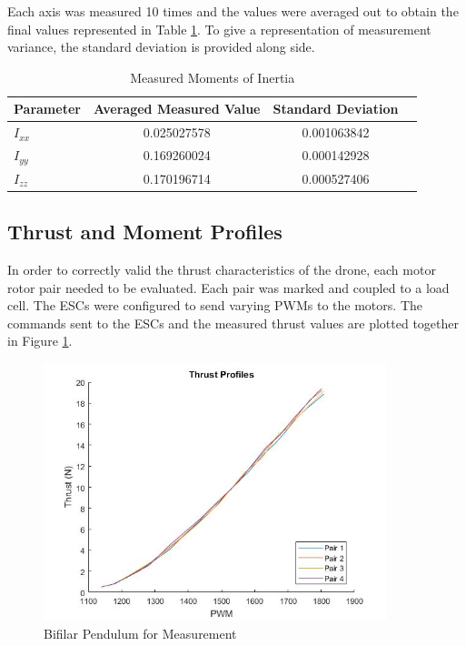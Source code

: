 	Each axis was measured 10 times and the values were averaged out to obtain the final values represented in Table \ref{tab:MomentOfInertia}. To give a representation of measurement variance, the standard deviation is provided along side.
	
	\begin{table}[!]
		\centering
		\begin{tabular}{l | c | c | c |}
			Parameter & Averaged Measured Value & Standard Deviation\\
			\hline\hline
			$I_{xx}$ & 0.025027578 & 0.001063842\\
			$I_{yy}$ & 0.169260024 & 0.000142928\\
			$I_{zz}$ & 0.170196714 & 0.000527406\\
		\end{tabular}
		\label{tab:MomentOfInertia}
		\caption{Measured Moments of Inertia}
	\end{table}
	
	\subsection{Thrust and Moment Profiles}
	In order to correctly valid the thrust characteristics of the drone, each motor rotor pair needed to be evaluated. Each pair was marked and coupled to a load cell. The ESCs were configured to send varying PWMs to the motors. The commands sent to the ESCs and the measured thrust values are plotted together in Figure \ref{IM_ThrustProfiles}.
	
	\begin{figure}[H]
		\centering
		\includegraphics[height = 7.5cm]{../Design/Mechanical/ThrustProfiles/thrustprofiles.jpg}
		\caption{Bifilar Pendulum for Measurement}
		\label{IM_ThrustProfiles}
	\end{figure}
	
